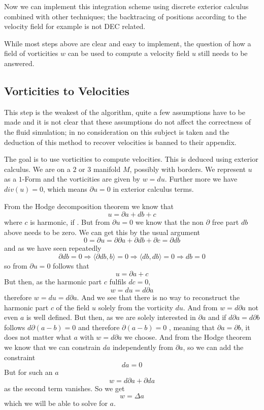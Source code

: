 Now we can implement this integration scheme using discrete exterior calculus combined with other techniques; the backtracing of positions according to the velocity field for example is not DEC related.

While most steps above are clear and easy to implement, the question of how a field of vorticities $w$ can be used to compute a velocity field $u$ still needs to be answered.

\subsection{Vorticities to Velocities}

This step is the weakest of the algorithm, quite a few assumptions have to be made and it is not clear that these assumptions do not affect the correctness of the fluid simulation; in  no consideration on this subject is taken and the deduction of this method to recover velocities is banned to their appendix.

The goal is to use vorticities to compute velocities. This is deduced using exterior calculus.
We are on a $2$ or $3$ manifold $M$, possibly with borders. We represent $u$ as a $1$-Form and the vorticities are given by $w = du$. Further more we have $div(u) = 0$, which means $\partial u = 0$ in exterior calculus terms.

From the Hodge decomposition theorem we know that
\[u = \partial a + db + c \]
where $c$ is harmonic, if . But from $\partial u = 0$ we know that the non $\partial$ free part $db$ above needs to be zero. We can get this by the usual argument
\[0 = \partial u = \partial \partial a + \partial db + \partial c = \partial d b\]
and as we have seen repeatedly 
\[\partial d b = 0 \Rightarrow \langle \partial d b , b \rangle = 0 \Rightarrow \langle db, db \rangle = 0 \Rightarrow db = 0\]
so from $\partial u = 0$ follows that 
\[u = \partial a + c\]
But then, as the harmonic part $c$ fulfils $dc = 0$,
\[w = du = d\partial a\]
therefore $w = du = d\partial a$. And we see that there is no way to reconstruct the harmonic part $c$ of the field $u$ solely from the vorticity $du$. And from $w = d \partial a$ not even $a$ is well defined. But then, as we are solely interested in $\partial a$ and if $ d \partial a = d \partial b$ follows $d \partial (a- b) = 0$ and therefore $\partial (a-b) = 0$ , meaning that $\partial a = \partial b$, it does not matter what $a$ with $w = d \partial a$ we choose. And from the Hodge theorem we know that we can constrain $da$ independently from $\partial a$, so we can add the constraint
\[da = 0\]
But for such an $a$
\[w = d\partial a + \partial d a\]
as the second term vanishes. So we get 
\[w = \Delta a\]
which we will be able to solve for $a$.

